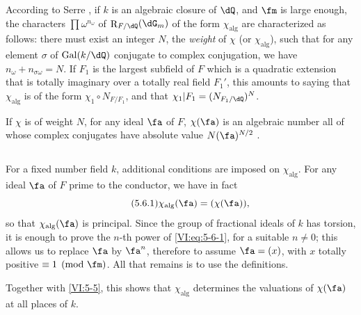 \documentclass[oneside]{book}
\DeclareMathOperator{\gal}{Gal}
\DeclareMathOperator{\res}{R} %
\newcounter{char}
\theoremstyle{sga-source}
\theoremstyle{sga-source-dash}
\theoremstyle{sga-source-dotdash}
\theoremstyle{sga-source-number-note-dash}
\theoremstyle{sga-source-note-number-dotdash}
\theoremstyle{sga-source-example-dotdash}
\theoremstyle{sga-source-inline-number}
\theoremstyle{sga-source-bare-number}
\theoremstyle{sga-source}
\newcommand{\PrintPage}[1]{}\newcommand{\MathPage}[1]{}\newcommand{\PrintCite}[2]{#1}\newcommand{\var}[3]{#1}
\begin{document}
According to Serre \cite[II.3]{se68}, if $k$ is an algebraic closure of 
$\dQ$, and $\fm$ is large enough, the characters $\prod \omega^{n_\omega}$ 
of $\res_{F/\dQ}(\dG_m)$ of the form $\chi_\text{alg}$ are characterized 
as follows: there must exist an integer $N$, the \emph{weight} of $\chi$ (or 
$\chi_\text{alg}$), such that for any element $\sigma$ of $\gal(k/\dQ)$ 
conjugate to complex conjugation, we have $n_\omega+n_{\sigma \omega}=N$. If 
$F_1$ is the largest subfield of $F$ which is a quadratic extension 
that is totally imaginary over a totally real field $F_1'$, this amounts to 
  saying that $\chi_\text{alg}$ is of the form $\chi_1\circ N_{F/F_1}$, and that 
  $\var{\chi_1|F_1=(N_{F_1/\dQ})^N}{\chi_1|F_1'=(N_{F_1'/\dQ})^N}{S45-SOL-0879}$. 

If $\chi$ is of weight $N$, for any ideal $\fa$ of $F$, $\chi(\fa)$ is an algebraic number all of whose complex conjugates have absolute value 
$N(\fa)^{N/2}$ \cite[II.3 prop.2]{se68}. 





\subsection{}\label{VI:5-6}

For a fixed number field $k$, additional conditions are 
imposed on $\chi_\text{alg}$. For any ideal $\fa$ of $F$ prime to the 
conductor, we have in fact 
\begin{equation*}\tag{5.6.1}\label{VI:eq:5-6-1}
  \chi_\text{alg}(\fa) = (\chi(\fa)) \text{,} 
\end{equation*}
so that $\chi_\text{alg}(\fa)$ is principal. Since the group of fractional ideals of \var{$k$ has torsion}{$k$ is torsion-free}{S45-SOL-0882}, it is enough to prove the $n$-th power 
of \eqref{VI:eq:5-6-1}, for a suitable $n\ne 0$; this allows us 
to replace $\fa$ by $\fa^n$, therefore to assume $\fa=(x)$, with $x$ totally 
positive $\equiv 1\pmod\fm$. All that remains is to use the definitions. 

\PrintPage{211}
Together with \ref{VI:5-5}, this shows that $\chi_\text{alg}$ determines the 
valuations of $\chi(\fa)$ at all places of $k$. 





\subsection{}\label{VI:5-7}
\end{document}
